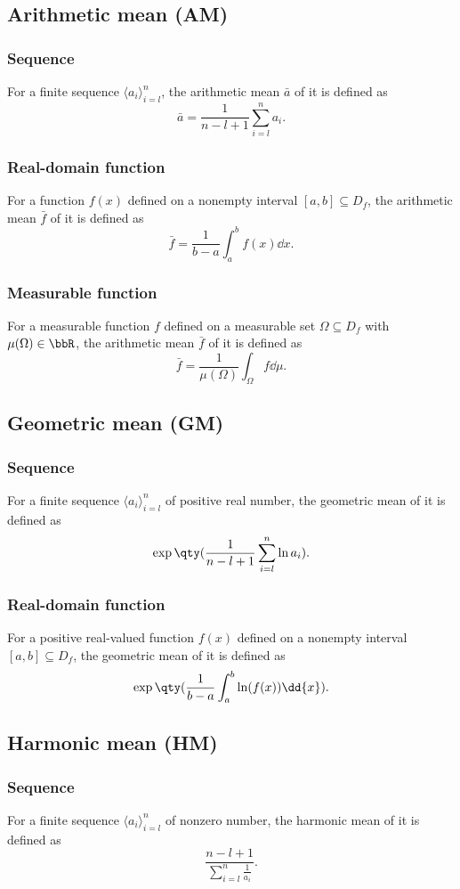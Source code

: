 \documentclass[a4paper,12pt]{report}
\begin{document}
\begin{itemize}
\begin{itemize}
\subsection{Arithmetic mean (AM)}
\subsubsection{Sequence}
For a finite sequence $\langle a_i\rangle_{i=l}^n$, the arithmetic mean $\bar{a}$ of it is defined as
\[\bar{a}=\frac{1}{n-l+1}\sum_{i=l}^na_i.\]
\subsubsection{Real-domain function}
For a function $f(x)$ defined on a nonempty interval $[a,b]\subseteq D_f$, the arithmetic mean $\bar{f}$ of it is defined as
\[\bar{f}=\frac{1}{b-a}\int_a^bf(x)\dd{x}.\]
\subsubsection{Measurable function}
For a measurable function $f$ defined on a measurable set $\Omega\subseteq D_f$ with $\mu(\Omega)\in\bbR$, the arithmetic mean $\bar{f}$ of it is defined as
\[\bar{f}=\frac{1}{\mu(\Omega)}\int_{\Omega}f\dd{\mu}.\]
\subsection{Geometric mean (GM)}
\subsubsection{Sequence}
For a finite sequence $\langle a_i\rangle_{i=l}^n$ of positive real number, the geometric mean of it is defined as
\[\exp\qty(\frac{1}{n-l+1}\sum_{i=l}^n\ln a_i).\]
\subsubsection{Real-domain function}
For a positive real-valued function $f(x)$ defined on a nonempty interval $[a,b]\subseteq D_f$, the geometric mean of it is defined as
\[\exp\qty(\frac{1}{b-a}\int_a^b\ln(f(x))\dd{x}).\]
\subsection{Harmonic mean (HM)}
\subsubsection{Sequence}
For a finite sequence $\langle a_i\rangle_{i=l}^n$ of nonzero number, the harmonic mean of it is defined as
\[\frac{n-l+1}{\sum_{i=l}^n\frac{1}{a_i}}.\]

\end{itemize}
\end{itemize}
\end{document}
